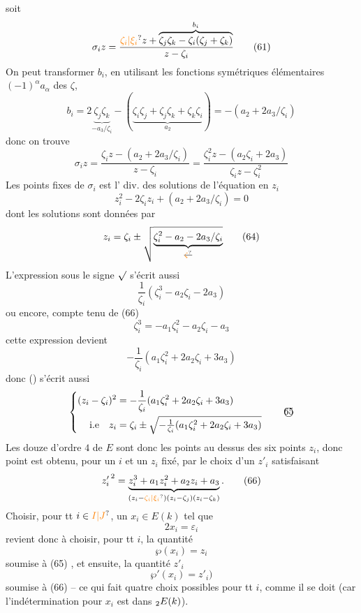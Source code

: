 soit
\[
 \sigma_i z=\frac{\unsure{\zeta_i|\xi_i}z+\overbrace{\zeta_j\zeta_k-\zeta_i(\zeta_j+\zeta_k)}^{b_i}}{z-\zeta_i}
 \tag*{(61)}
\]
On peut transformer $b_i$, en utilisant les fonctions symétriques élémentaires $(-1)^\alpha a_\alpha$ des $\zeta$,
\[
 b_i=2\underbrace{\zeta_j\zeta_k}_{-a_3/\zeta_i}-
 (\underbrace{\zeta_i\zeta_j+\zeta_j\zeta_k+\zeta_k\zeta_i}_{a_2})
 =-(a_2+2a_3/\zeta_i)
\]
donc on trouve
\[
 \sigma_i z=\frac{\zeta_i z-(a_2+2a_3/\zeta_i)}{z-\zeta_i}
 =\frac{\zeta_i^2z-(a_2\zeta_i+2a_3)}{\zeta_i z-\zeta_i^2}
 \tag*{(62)}
\]
Les  points fixes de $\sigma_i$ est l' div. des solutions de l'équation en $z_i$
\[
 z_i^2-2\zeta_i z_i+(a_2+2a_3/\zeta_i)=0 \tag*{(63)}
\]
dont les solutions sont données par
\[
 z_i=\zeta_i\pm\sqrt{\underbrace{\zeta_i^2-a_2-2a_3/\zeta_i}_{\deleted{\unsure{\zeta}}}} \tag*{(64)}
\]
L'expression sous le signe $\sqrt{\vphantom{x}}$ s'écrit aussi
\[
 \frac{1}{\zeta_i}(\zeta_i^3-a_2\zeta_i-2a_3)
\]
ou encore, compte tenu de (66)
\[
 \zeta_i^3=-a_1\zeta_i^2-a_2\zeta_i-a_3
\]
 cette expression devient
\[
 -\frac{1}{\zeta_i}(a_1\zeta_i^2+2a_2\zeta_i+3a_3)
\]
donc () s'écrit aussi
\[
 \left\{\begin{aligned}
 (z_i-\zeta_i)^2&=-\frac{1}{\zeta_i}(a_1\zeta_i^2+2a_2\zeta_i+3a_3)\\
 \text{i.e}\quad z_i&=\zeta_i\pm\sqrt{-\tfrac1{\zeta_i}(a_1\zeta_i^2+2a_2\zeta_i+3a_3)}
 \end{aligned}\right. \tag*{\textcircled{65}}
\]
Les douze  d'ordre $4$ de $E$ sont donc les points au dessus des six points $z_i$, donc  
point est obtenu, pour un $i$ et un $z_i$ fixé, par le choix d'un $z'_i$ satisfaisant
\[
 {z'_i}^{\,2}=\underbrace{z_i^3+a_1z_i^2+a_2z_i+a_3}_{(z_i-\unsure{\zeta_i|\xi_i})(z_i-\zeta_j)(z_i-\zeta_k)}. \tag*{(66)}
\]
Choisir, pour tt $i\in\unsure{I|J}$, un $x_i\in E(k)$ tel que
\[
 2x_i=\varepsilon_i \tag*{(67)}
\]
revient donc à choisir, pour tt $i$,  la quantité
\[
 \wp(x_i)=z_i \tag*{(68 a)}
\]
soumise à (65) , et ensuite, la quantité $z'_i$
\[
 \wp'(x_i)=z'_i) \tag*{(68 b)}
\]
soumise à (66) -- ce qui fait quatre choix possibles pour tt $i$, comme il se doit (car l'indétermination pour $x_i$ est dans $\vphantom{E}_2E(k)$).

